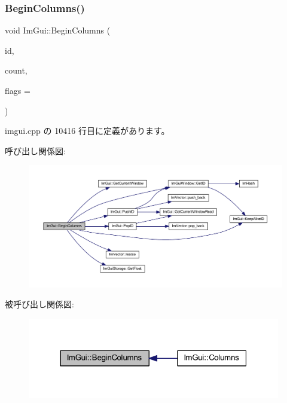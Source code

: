 \subsubsection{\texorpdfstring{Begin\+Columns()}{BeginColumns()}}
{\footnotesize\ttfamily void Im\+Gui\+::\+Begin\+Columns (\begin{DoxyParamCaption}\item[{const char $\ast$}]{id,  }\item[{int}]{count,  }\item[{\mbox{\hyperlink{imgui_8h_a0edb3053546fcf6c5f7dcb7531c3a17a}{Im\+Gui\+Columns\+Flags}}}]{flags = {} }\end{DoxyParamCaption})}



 imgui.\+cpp の 10416 行目に定義があります。

呼び出し関係図\+:\nopagebreak
\begin{figure}[H]
\begin{center}
\leavevmode
\includegraphics[width=350pt]{namespace_im_gui_a4b0c247a5d091c5921c58de6bc8215aa_cgraph}
\end{center}
\end{figure}
被呼び出し関係図\+:\nopagebreak
\begin{figure}[H]
\begin{center}
\leavevmode
\includegraphics[width=313pt]{namespace_im_gui_a4b0c247a5d091c5921c58de6bc8215aa_icgraph}
\end{center}
\end{figure}
\mbox{\label{namespace_im_gui_a08acc516e0de3cbb99f00774778a440a}} 
